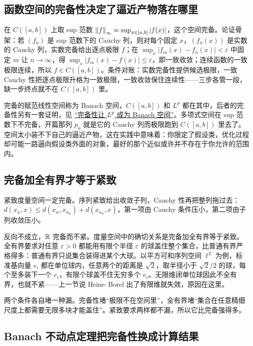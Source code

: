 \subsection{函数空间的完备性决定了逼近产物落在哪里}

在 \(C([a,b])\) 上取 sup 范数 \(\left\lVert f\right\rVert_\infty=\sup_{x\in[a,b]}|f(x)|\)，这个空间完备。论证骨架：若 \((f_n)\) 是 sup 范数下的 Cauchy 列，则对每个固定 \(x\)，\((f_n(x))\) 是实数的 Cauchy 列，实数完备给出逐点极限 \(f\)；在 \(\sup_x|f_m(x)-f_n(x)|<\varepsilon\) 中固定 \(m\) 让 \(n\to\infty\)，得 \(\sup_x|f_m(x)-f(x)|\le\varepsilon\)，即一致收敛；连续函数的一致极限连续，所以 \(f\in C([a,b])\)。条件对账：实数完备性提供候选极限，一致 Cauchy 性把逐点极限升格为一致极限，一致收敛保住连续性——三步各管一段，缺一步终点就不在 \(C([a,b])\) 里。

完备的赋范线性空间称为 Banach 空间，\(C([a,b])\) 和 \(L^p\) 都在其中，后者的完备性另有一套证明，见 \hyperref[sec:12-Real-Analysis-Support/07-Lp-Spaces-and-Function-Geometry/02]{``完备性让 \(L^p\) 成为 Banach 空间''}。多项式空间在 sup 范数下不完备，开篇那列 \(p_n\) 就是它的 Cauchy 列而极限跑到 \(C([a,b])\) 里去了。空间太小装不下自己的逼近产物，这在实践中意味着：你限定了假设类，优化过程却可能一路逼向假设类外面的对象，最好的那个近似或许并不存在于你允许的范围内。

\subsection{完备加全有界才等于紧致}

紧致度量空间一定完备。序列紧致给出收敛子列，Cauchy 性再把整列拖过去：\(d(x_n,x)\le d(x_n,x_{n_k})+d(x_{n_k},x)\)，第一项由 Cauchy 条件压小，第二项由子列收敛压小。

反向不成立，\(\mathbb{R}\) 完备而不紧。度量空间中的确切关系是完备加全有界等于紧致。全有界要求对任意 \(\varepsilon>0\) 都能用有限个半径 \(\varepsilon\) 的球盖住整个集合，比普通有界严格得多：普通有界只说集合装得进某个大球。以平方可和序列空间 \(\ell^2\) 为例，标准基向量 \(e_i\) 都在单位球内，任意两个的距离是 \(\sqrt2\)，取半径小于 \(\sqrt2/2\) 的球，每个至多装下一个 \(e_i\)，有限个球盖不住无穷多个 \(e_i\)。无限维闭单位球因此不全有界，也就不紧——上一节说 Heine--Borel 出了有限维就失效，原因在这里。

两个条件各自堵一种漏。完备性堵``极限不在空间里''，全有界堵``集合在任意精细尺度上都需要无限多块才能盖住''。紧致要求两样都不漏，所以它比完备强得多。

\subsection{Banach 不动点定理把完备性换成计算结果}

